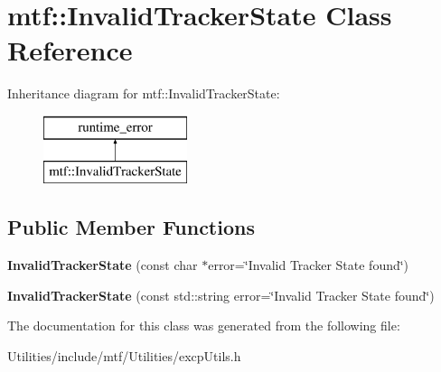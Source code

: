 \hypertarget{classmtf_1_1InvalidTrackerState}{\section{mtf\-:\-:Invalid\-Tracker\-State Class Reference}
\label{classmtf_1_1InvalidTrackerState}
}
Inheritance diagram for mtf\-:\-:Invalid\-Tracker\-State\-:\begin{figure}[H]
\begin{center}
\leavevmode
\includegraphics[height=2.000000cm]{classmtf_1_1InvalidTrackerState}
\end{center}
\end{figure}
\subsection*{Public Member Functions}
\begin{DoxyCompactItemize}
\item 
\hypertarget{classmtf_1_1InvalidTrackerState_a1f39f315ca9a3a02539974945f3a551e}{{\bfseries Invalid\-Tracker\-State} (const char $\ast$error=\char`\"{}Invalid Tracker State found\char`\"{})}\label{classmtf_1_1InvalidTrackerState_a1f39f315ca9a3a02539974945f3a551e}

\item 
\hypertarget{classmtf_1_1InvalidTrackerState_aa9c67924aa7d1130258849a54174b354}{{\bfseries Invalid\-Tracker\-State} (const std\-::string error=\char`\"{}Invalid Tracker State found\char`\"{})}\label{classmtf_1_1InvalidTrackerState_aa9c67924aa7d1130258849a54174b354}

\end{DoxyCompactItemize}


The documentation for this class was generated from the following file\-:\begin{DoxyCompactItemize}
\item 
Utilities/include/mtf/\-Utilities/excp\-Utils.\-h\end{DoxyCompactItemize}
